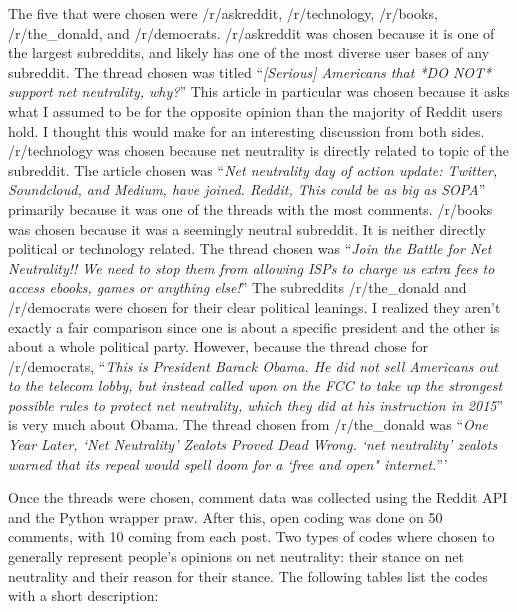 \documentclass[11pt]{article}
\begin{document}
	The five that were chosen were /r/askreddit, /r/technology, /r/books, /r/the\_donald, and /r/democrats. /r/askreddit was chosen because it is one of the largest subreddits, and likely has one of the most diverse user bases of any subreddit. The thread chosen was titled ``\textit{[Serious] Americans that *DO NOT* support net neutrality, why?}'' This article in particular was chosen because it asks what I assumed to be for the opposite opinion than the majority of Reddit users hold. I thought this would make for an interesting discussion from both sides. /r/technology was chosen because net neutrality is directly related to topic of the subreddit. The article chosen was ``\textit{Net neutrality day of action update: Twitter, Soundcloud, and Medium, have joined. Reddit, This could be as big as SOPA}'' primarily because it was one of the threads with the most comments. /r/books was chosen because it was a seemingly neutral subreddit. It is neither directly political or technology related. The thread chosen was ``\textit{Join the Battle for Net Neutrality!! We need to stop them from allowing ISPs to charge us extra fees to access ebooks, games or anything else!}'' The subreddits /r/the\_donald and /r/democrats were chosen for their clear political leanings. I realized they aren't exactly a fair comparison since one is about a specific president and the other is about a whole political party. However, because the thread chose for /r/democrats, ``\textit{This is President Barack Obama. He did not sell Americans out to the telecom lobby, but instead called upon on the FCC to take up the strongest possible rules to protect net neutrality, which they did at his instruction in 2015}'' is very much about Obama. The thread chosen from /r/the\_donald was ``\textit{One Year Later, `Net Neutrality' Zealots Proved Dead Wrong. `net neutrality' zealots warned that its repeal would spell doom for a `free and open" internet.}'''
	
	Once the threads were chosen, comment data was collected using the Reddit API and the Python wrapper praw. After this, open coding was done on 50 comments, with 10 coming from each post. Two types of codes where chosen to generally represent people's opinions on net neutrality: their stance on net neutrality and their reason for their stance. The following tables list the codes with a short description:
		
		
		
\end{document}
